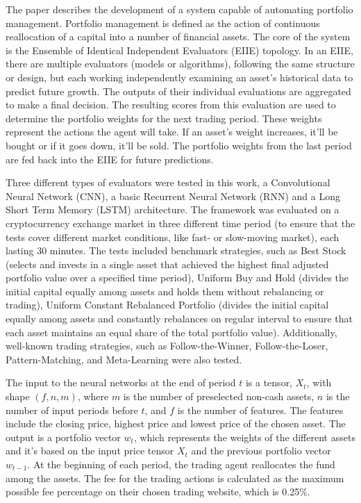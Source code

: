 \documentclass[a4paper,oneside,onecolumn,12pt]{book}
\begin{document}
	The paper describes the development of a system capable of automating portfolio management. Portfolio management is defined as the action of continuous reallocation of a capital into a number of financial assets. The core of the system is the Ensemble of Identical Independent Evaluators (EIIE) topology.  In an EIIE, there are multiple evaluators (models or algorithms), following the same structure or design, but each working independently examining an asset's historical data to predict future growth. The outputs of their individual evaluations are aggregated to make a final decision. The resulting scores from this evaluation are used to determine the portfolio weights for the next trading period. These weights represent the actions the agent will take. If an asset's weight increases, it'll be bought or if it goes down, it'll be sold. The portfolio weights from the last period are fed back into the EIIE for future predictions.

	Three different types of evaluators were tested in this work, a Convolutional Neural Network (CNN), a basic Recurrent Neural Network (RNN) and a Long Short Term Memory (LSTM) architecture. The framework was evaluated on a cryptocurrency exchange market in three different time period (to ensure that the tests cover different market conditions, like fast- or slow-moving market), each lasting 30 minutes. The tests included benchmark strategies, such as Best Stock (selects and invests in a single asset that achieved the highest final adjusted portfolio value over a specified time period), Uniform Buy and Hold (divides the initial capital equally among assets and holds them without rebalancing or trading), Uniform Constant Rebalanced Portfolio (divides the initial capital equally among assets and constantly rebalances on regular interval to ensure that each asset maintains an equal share of the total portfolio value). Additionally, well-known trading strategies, such as Follow-the-Winner, Follow-the-Loser, Pattern-Matching, and Meta-Learning were also tested.

	The input to the neural networks at the end of period $t$ is a tensor, $X_t$, with shape $(f,n,m)$, where $m$ is the number of preselected non-cash assets, $n$ is the number of input periods before $t$, and $f$ is the number of features. The features include the closing price, highest price and lowest price of the chosen asset. The output is a portfolio vector $w_t$, which represents the weights of the different assets and it's based on the input price tensor $X_t$ and the previous portfolio vector $w_{t-1}$. At the beginning of each period, the trading agent reallocates the fund among the assets. The fee for the trading actions is calculated as the maximum possible fee percentage on their chosen trading website, which is 0.25\%. 
\end{document}
